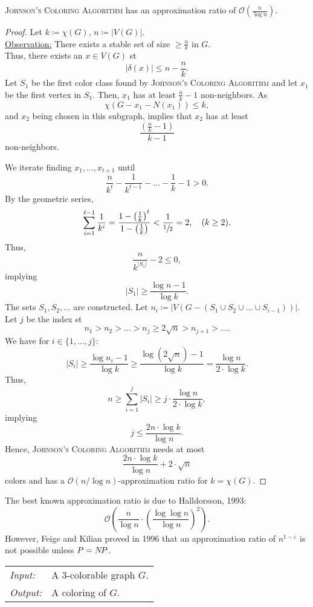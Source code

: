 \documentclass[../skript.tex]{subfiles}
\begin{document}
\EndAlgorithmLine
\begin{theorem} %
\textsc{Johnson's Coloring Algorithm} has an approximation ratio of $\mathcal{O}(\frac{n}{\log n})$.
\end{theorem}
\begin{proof}
Let $k \coloneqq \chi(G)$, $n \coloneqq |V(G)|$. \\
\underline{Observation:} There exists a stable set of size $\geq \frac{n}{k}$ in $G$. \\
Thus, there exists an $x \in V(G)$ \ac{st}
\[
	|\delta(x)| \leq n - \frac{n}{k}.
\]
Let $S_1$ be the first color class found by \textsc{Johnson's Coloring Algorithm} and let $x_1$ be the first vertex in $S_1$. Then, $x_1$ has at least $\frac{n}{k} - 1$ non-neighbors.
As
\[
	\chi(G - x_1 - N(x_1)) \leq k,
\]
and $x_2$ being chosen in this subgraph, implies that $x_2$ has at least
\[
	\frac{ \left( \frac{n}{k} - 1 \right) }{ k - 1 }
\]
non-neighbors.

We iterate finding $x_1, \ldots, x_{t+1}$ until
\[
	\frac{n}{k^t} - \frac{1}{k^{t-1}} - \ldots - \frac{1}{k} - 1 > 0.
\]
By the geometric series,
\[
	\sum_{i=1}^{t-1} \frac{1}{k^i} = \frac{1 - \left( \frac{1}{k} \right)^t}{1 - \left( \frac{1}{k} \right)} < \frac{1}{\sfrac{1}{2}} = 2, \quad (k \geq 2).
\]
Thus,
\[
	\frac{n}{k^{|S_1|}} - 2 \leq 0,
\]
implying
\[
	|S_1| \geq \frac{\log n - 1}{\log k}.
\]
The sets $S_1, S_2, \ldots$ are constructed. Let $n_i \coloneqq |V(G - (S_1 \cup S_2 \cup \ldots \cup S_{i-1}))|$.
Let $j$ be the index \ac{st}
\[
	n_1 > n_2 > \ldots > n_j \geq 2 \sqrt{n} > n_{j+1} > \ldots.
\]
We have for $i \in \{1, \ldots, j\}$:
\[
	|S_i| \geq \frac{\log n_i - 1}{\log k} \geq \frac{\log(2 \sqrt{n}) - 1}{\log k} = \frac{\log n}{2 \cdot \log k}.
\]
Thus,
\[
	n \geq \sum_{i=1}^j |S_i| \geq j \cdot \frac{\log n}{2 \cdot \log k},
\]
implying
\[
	j \leq \frac{2n \cdot \log k}{\log n}.
\]
Hence, \textsc{Johnson's Coloring Algorithm} needs at most
\[
	\frac{2n \cdot \log k}{\log n} + 2 \cdot \sqrt{n}
\]
colors and has a $\mathcal{O}(n/\log n)$-approximation ratio for $k = \chi(G)$.
\end{proof}
The best known approximation ratio is due to Halldorsson, 1993:
\[
	\mathcal{O} \left( \frac{n}{\log n} \cdot \left( \frac{\log \log n}{\log n} \right)^2 \right).
\]
However, Feige and Kilian proved in 1996 that an approximation ratio of $n^{1 - \varepsilon}$ is not possible unless $P = N \! P$.
\begin{algorithmbox}
\begin{tabular}{@{}ll}
\textit{Input:} & A 3-colorable graph $G$. \\
\textit{Output:} & A coloring of $G$.
\end{tabular}
\end{algorithmbox}
\end{document}
